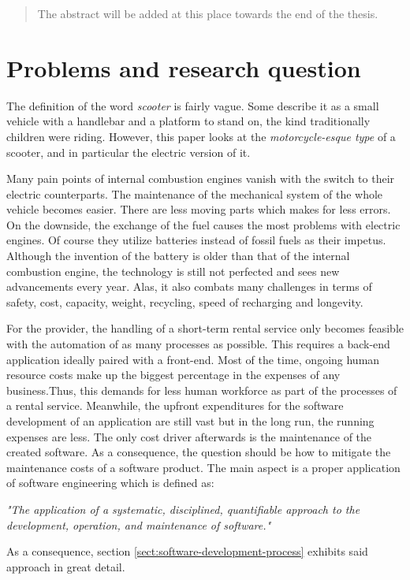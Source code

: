 \documentclass[12pt,a4paper]{report}
\begin{document}



\begin{abstract}

The abstract will be added at this place towards the end of the thesis.

\end{abstract}


\tableofcontents



\chapter{Problems and research question} \label{chap:intro}



The definition of the word \emph{scooter} is fairly vague.
Some describe it as a small vehicle with a handlebar and a platform to stand on,
the kind traditionally children were riding.
However, this paper looks at the \emph{motorcycle-esque type} of a scooter, and in
particular the electric version of it.

Many pain points of internal combustion engines vanish with the switch to their electric
counterparts. The maintenance of the mechanical system of the whole vehicle becomes easier.
There are less moving parts which makes for less errors.
On the downside, the exchange of the fuel causes the most problems with electric engines.
Of course they utilize batteries instead of fossil fuels as their impetus.
Although the invention of the battery is older than that of the
internal combustion engine\cn, the technology is still not perfected and sees new
advancements every year. Alas, it also combats many challenges in terms of
safety, cost, capacity, weight, recycling, speed of recharging and longevity.

For the provider, the handling of a short-term rental service
only becomes feasible with the automation of as many processes as possible.
This requires a back-end application ideally paired with a front-end.
Most of the time, ongoing human resource costs make up the biggest percentage
in the expenses of any business.\cn Thus, this demands for less human workforce
as part of the processes of a rental service.
Meanwhile, the upfront expenditures for the software development of
an application are still vast but in the long run, the running expenses are less.
The only cost driver afterwards is the maintenance of the created software.
As a consequence, the question should be how to mitigate the maintenance costs
of a software product. The main aspect is a proper application of
software engineering which is defined as:
\begin{displayquote}
\emph{"The application of a systematic, disciplined, quantifiable approach to the
development, operation, and maintenance of software."}~\cite{se-ieee}
\end{displayquote}
As a consequence, section \ref{sect:software-development-process} exhibits
said approach in great detail.
\end{document}
